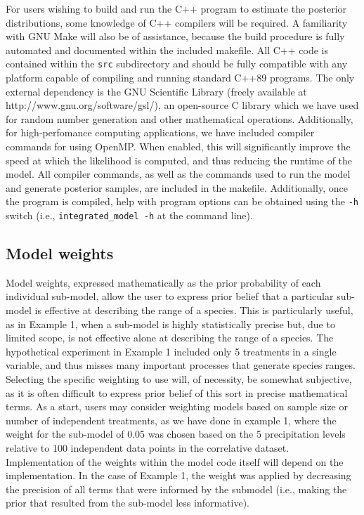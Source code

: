 \documentclass[11pt]{article}
\newcommand{\rev}[1]{{\color{RoyalBlue}#1}}
\begin{document}
{For users wishing to build and run the C++ program to estimate the posterior distributions, some knowledge of C++ compilers will be required.
A familiarity with GNU Make will also be of assistance, because the build procedure is fully automated and documented within the included makefile.
All C++ code is contained within the {\tt src} subdirectory and should be fully compatible with any platform capable of compiling and running standard C++89 programs.
The only external dependency is the GNU Scientific Library (freely available at http://www.gnu.org/software/gsl/), an open-source C library which we have used for random number generation and other mathematical operations.
Additionally, for high-perfomance computing applications, we have included compiler commands for using OpenMP.
When enabled, this will significantly improve the speed at which the likelihood is computed, and thus reducing the runtime of the model.
All compiler commands, as well as the commands used to run the model and generate posterior samples, are included in the makefile.
Additionally, once the program is compiled, help with program options can be obtained using the {\tt -h} switch (i.e., {\tt integrated\_model -h} at the command line).
}
 
\subsection*{Model weights}
\rev{Model weights, expressed mathematically as the prior probability of each individual sub-model, allow the user to express prior belief that a particular sub-model is effective at describing the range of a species.
This is particularly useful, as in Example 1, when a sub-model is highly statistically precise but, due to limited scope, is not effective alone at describing the range of a species.
The hypothetical experiment in Example 1 included only 5 treatments in a single variable, and thus misses many important processes that generate species ranges.
Selecting the specific weighting to use will, of necessity, be somewhat subjective, as it is often difficult to express prior belief of this sort in precise mathematical terms.
As a start, users may consider weighting models based on sample size or number of independent treatments, as we have done in example 1, where the weight for the sub-model of 0.05 was chosen based on the 5 precipitation levels relative to 100 independent data points in the correlative dataset.
Implementation of the weights within the model code itself will depend on the implementation.
In the case of Example 1, the weight was applied by decreasing the precision of all terms that were informed by the submodel (i.e., making the prior that resulted from the sub-model less informative).
}

\renewcommand\refname{Literature Cited}
{}

\end{document}
